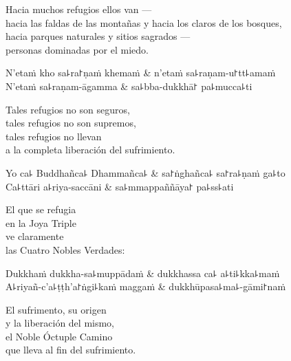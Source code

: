 \begin{english}
  Hacia muchos refugios ellos van ---\\
  hacia las faldas de las montañas y hacia los claros de los bosques,\\
  hacia parques naturales y sitios sagrados ---\\
  personas dominadas por el miedo.
\end{english}

\begin{twochants}
  N'etaṁ kho sa꜕ra꜓ṇaṁ khemaṁ & n'etaṁ sa꜕raṇam-u꜓tt꜕amaṁ \\
  N'etaṁ sa꜕raṇam-āgamma & sa꜕bba-dukkhā꜓ pa꜕mucca꜕ti \\
\end{twochants}

\begin{english}
  Tales refugios no son seguros,\\
  tales refugios no son supremos,\\
  tales refugios no llevan\\
  a la completa liberación del sufrimiento.
\end{english}

\begin{twochants}
  Yo ca꜕ Buddhañca꜕ Dhammañca꜕ & sa꜓ṅghañca꜕ sa꜓ra꜕ṇaṁ ga꜕to \\
  Ca꜕ttāri a꜕riya-saccāni & sa꜕mmappaññāya꜓ pa꜕ss꜕ati \\
\end{twochants}

\begin{english}
  El que se refugia\\
  en la Joya Triple\\
  ve claramente\\
  las Cuatro Nobles Verdades:
\end{english}

\begin{twochants}
  Dukkhaṁ dukkha-sa꜕muppādaṁ & dukkhassa ca꜕ a꜕ti꜕kka꜕maṁ \\
  A꜕riyañ-c'a꜕ṭṭh'a꜓ṅgi꜕kaṁ maggaṁ & dukkhūpasa꜕ma꜕-gāmi꜓naṁ \\
\end{twochants}

\begin{english}
  El sufrimento, su origen \\
  y la liberación del mismo,\\
  el Noble Óctuple Camino\\
  que lleva al fin del sufrimiento.
\end{english}

